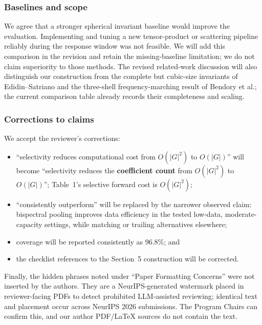 \documentclass[10pt]{article}
\begin{document}
\subsubsection*{Baselines and scope}

We agree that a stronger spherical invariant baseline would improve the
evaluation. Implementing and tuning a new tensor-product or scattering
pipeline reliably during the response window was not feasible. We will add
this comparison in the revision and retain the missing-baseline limitation;
we do not claim superiority to those methods. The revised related-work
discussion will also distinguish our construction from the complete but
cubic-size invariants of Edidin--Satriano and the three-shell
frequency-marching result of Bendory et al.; the current comparison table
already records their completeness and scaling.

\subsubsection*{Corrections to claims}

We accept the reviewer's corrections:

\begin{itemize}
\item ``selectivity reduces computational cost from $O(|G|^2)$ to $O(|G|)$''
  will become ``selectivity reduces the \textbf{coefficient count} from
  $O(|G|^2)$ to $O(|G|)$''; Table~1's selective forward cost is $O(|G|^2)$;
\item ``consistently outperform'' will be replaced by the narrower observed
  claim: bispectral pooling improves data efficiency in the tested low-data,
  moderate-capacity settings, while matching or trailing alternatives
  elsewhere;
\item coverage will be reported consistently as 96.8\%; and
\item the checklist references to the Section~5 construction will be
  corrected.
\end{itemize}

Finally, the hidden phrases noted under ``Paper Formatting Concerns'' were
not inserted by the authors. They are a NeurIPS-generated watermark placed in
reviewer-facing PDFs to detect prohibited LLM-assisted reviewing; identical
text and placement occur across NeurIPS 2026 submissions. The Program Chairs
can confirm this, and our author PDF/LaTeX sources do not contain the text.
\end{document}
